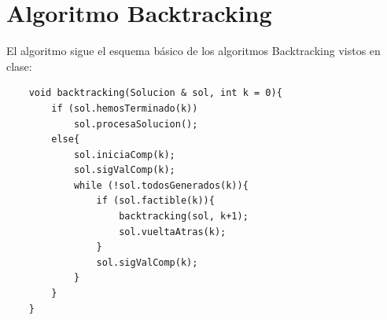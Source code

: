 \documentclass{article}
\begin{document}
	\section{Algoritmo Backtracking}
	El algoritmo sigue el esquema básico de los algoritmos Backtracking vistos en clase: 
	
	\begin{lstlisting}
	void backtracking(Solucion & sol, int k = 0){
		if (sol.hemosTerminado(k))
			sol.procesaSolucion();
		else{
			sol.iniciaComp(k);
			sol.sigValComp(k);
			while (!sol.todosGenerados(k)){
				if (sol.factible(k)){
					backtracking(sol, k+1);
					sol.vueltaAtras(k);
				}
				sol.sigValComp(k);
			}
		}
	}
	
	\end{lstlisting}
	
	
	
\end{document}
